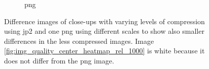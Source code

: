 \begin{figure}[htb]
\begin{subfigure}[b]{0.42\textwidth}
            \caption{\gls{png}}
            \label{fig:img_quality_center_heatmap_rel_png}
        \end{subfigure}
    \caption{Difference images of close-ups with varying levels of compression using \gls{jp2} and one \gls{png} using different scales to show also smaller differences in the less compressed images. Image \ref{fig:img_quality_center_heatmap_rel_1000} is white because it does not differ from the \gls{png} image.}
    \label{fig:img_quality_center_heatmap_rel}
\end{figure}